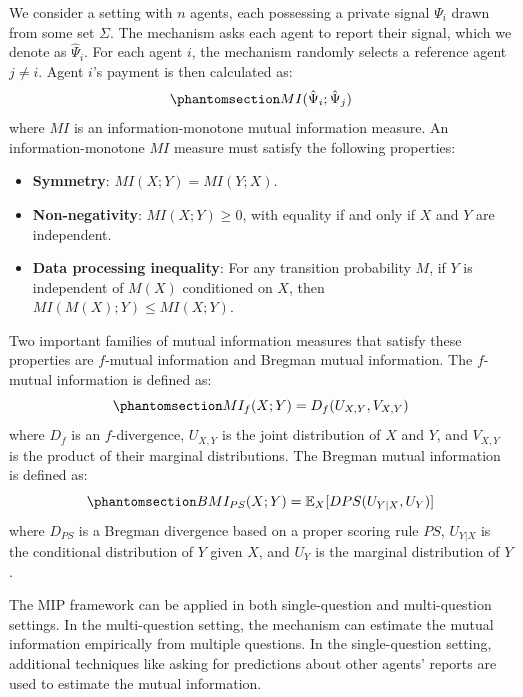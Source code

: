\documentclass[
  letterpaper,
  numbers=noenddot,
  DIV=11]{scrreprt}
\theoremstyle{plain}
\theoremstyle{definition}
\theoremstyle{plain}
\theoremstyle{remark}
\begin{document}
We consider a setting with \(n\) agents, each possessing a private
signal \(\Psi_i\) drawn from some set \(\Sigma\). The mechanism asks
each agent to report their signal, which we denote as \(\hat{\Psi}_i\).
For each agent \(i\), the mechanism randomly selects a reference agent
\(j \neq i\). Agent \(i\)'s payment is then calculated as:
\begin{equation}\phantomsection\label{eq-eq3.68}{MI(\hat{\Psi}_i; \hat{\Psi}_j)}\end{equation}
where \(MI\) is an information-monotone mutual information measure. An
information-monotone \(MI\) measure must satisfy the following
properties:

\begin{itemize}
\item
  \textbf{Symmetry}: \(MI(X; Y) = MI(Y; X)\).
\item
  \textbf{Non-negativity}: \(MI(X; Y) \geq 0\), with equality if and
  only if \(X\) and \(Y\) are independent.
\item
  \textbf{Data processing inequality}: For any transition probability
  \(M\), if \(Y\) is independent of \(M(X)\) conditioned on \(X\), then
  \(MI(M(X); Y) \leq MI(X; Y)\).
\end{itemize}

Two important families of mutual information measures that satisfy these
properties are \(f\)-mutual information and Bregman mutual information.
The \(f\)-mutual information is defined as:
\begin{equation}\phantomsection\label{eq-eq3.69}{MI_f(X; Y) = D_f(U_{X,Y}, V_{X,Y})}\end{equation}
where \(D_f\) is an \(f\)-divergence, \(U_{X,Y}\) is the joint
distribution of \(X\) and \(Y\), and \(V_{X,Y}\) is the product of their
marginal distributions. The Bregman mutual information is defined as:
\begin{equation}\phantomsection\label{eq-eq3.70}{BMI_{PS}(X; Y) = \mathbb{E}_{X} [D{PS}(U_{Y|X}, U_Y)]}\end{equation}
where \(D_{PS}\) is a Bregman divergence based on a proper scoring rule
\(PS\), \(U_{Y|X}\) is the conditional distribution of \(Y\) given
\(X\), and \(U_Y\) is the marginal distribution of \(Y\).

The MIP framework can be applied in both single-question and
multi-question settings. In the multi-question setting, the mechanism
can estimate the mutual information empirically from multiple questions.
In the single-question setting, additional techniques like asking for
predictions about other agents' reports are used to estimate the mutual
information.
\end{document}
